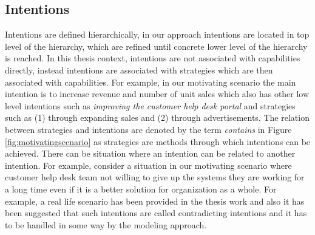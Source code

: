 \subsection{Intentions} 
\label{sec:intentions}
Intentions are defined hierarchically, in our approach intentions are located in top level of the hierarchy, which are refined until concrete lower level of the hierarchy is reached. In this thesis context, intentions are not associated with capabilities directly, instead intentions are associated with strategies which are then associated with capabilities. For example, in our motivating scenario the main intention is to increase revenue and number of unit sales which also has other low level intentions such as \textit{improving the customer help desk portal} and strategies such as (1) through expanding sales and (2) through advertisements. The relation between strategies and intentions are denoted by the term \textit{contains} in Figure \ref{fig:motivatingscenario} as strategies are methods through which intentions can be achieved. There can be situation where an intention can be related to another intention. For example, consider a situation in our motivating scenario where customer help desk team not willing to give up the systems they are working for a long time even if it is a better solution for organization as a whole. For example, a real life scenario has been provided in the thesis work \cite{Sierr2015} and also it has been suggested that such intentions are called contradicting intentions and it has to be handled in some way by the modeling approach. 


